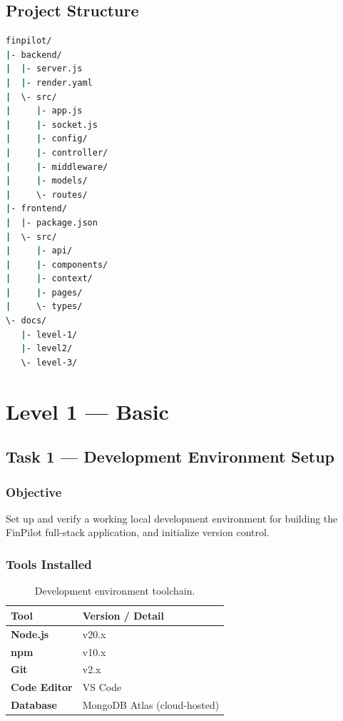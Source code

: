 \documentclass[11pt,a4paper]{report}
\begin{document}
\section{Project Structure}
\begin{lstlisting}[language=bash,caption={FinPilot repository structure.}]
finpilot/
|- backend/
|  |- server.js
|  |- render.yaml
|  \- src/
|     |- app.js
|     |- socket.js
|     |- config/
|     |- controller/
|     |- middleware/
|     |- models/
|     \- routes/
|- frontend/
|  |- package.json
|  \- src/
|     |- api/
|     |- components/
|     |- context/
|     |- pages/
|     \- types/
\- docs/
   |- level-1/
   |- level2/
   \- level-3/
\end{lstlisting}

\chapter{Level 1 --- Basic}

\section{Task 1 --- Development Environment Setup}

\subsection{Objective}
Set up and verify a working local development environment for building the
FinPilot full-stack application, and initialize version control.

\subsection{Tools Installed}
\begin{table}[H]
\centering
\begin{tabularx}{\linewidth}{>{\bfseries}l X}
\toprule
Tool & Version / Detail \\
\midrule
Node.js      & v20.x \\
npm          & v10.x \\
Git          & v2.x \\
Code Editor  & VS Code \\
Database     & MongoDB Atlas (cloud-hosted) \\
\bottomrule
\end{tabularx}
\caption{Development environment toolchain.}
\end{table}
\end{document}
